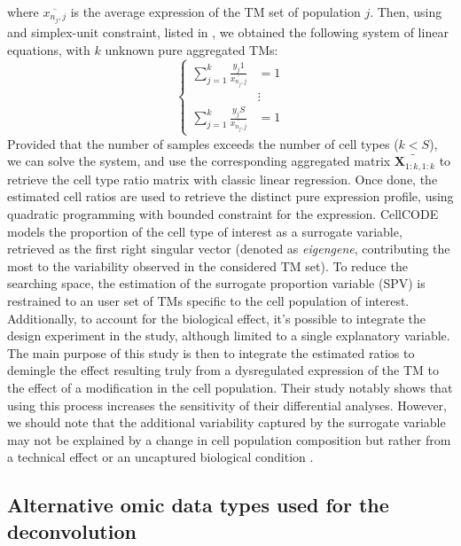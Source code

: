 where \(\overline{x_{n_j, j}}\) is the average expression of the TM
set of population \(j\). Then, using  and simplex-unit constraint, listed in , we obtained the
following system of linear equations, with \(k\) unknown pure aggregated
TMs: \[
\begin{cases}
\sum_{j=1}^k \frac{y_j1}{\overline{x_{n_j, j}}}&=1\\
& \vdots \\
\sum_{j=1}^k \frac{y_jS}{\overline{x_{n_j, j}}}&=1
\end{cases}
\] Provided that the number of samples exceeds the number of cell types
(\(k < S\)), we can solve the system, and use the corresponding
aggregated matrix \(\widetilde{\boldsymbol{X}_{1:k, 1:k}}\) to retrieve the cell type ratio matrix with
classic linear regression. Once done, the estimated cell ratios are used
to retrieve the distinct pure expression profile, using
quadratic programming with bounded constraint for the expression.
CellCODE \autocite{chikina_etal15} models the proportion of the cell type of interest as a
surrogate variable, retrieved as the first right singular vector
(denoted as \emph{eigengene}, contributing the most to the variability
observed in the considered TM set). To reduce the searching space, the
estimation of the surrogate proportion variable (SPV) is restrained to
an user set of TMs specific to the cell population of interest.
Additionally, to account for the biological effect, it's possible to
integrate the design experiment in the study, although limited to a
single explanatory variable. The main purpose of this study is then to
integrate the estimated ratios to demingle the effect resulting truly
from a dysregulated expression of the TM to the effect of a modification
in the cell population. Their study notably shows that using this
process increases the sensitivity of their differential analyses.
However, we should note that the additional variability captured by the
surrogate variable may not be explained by a change in cell population
composition but rather from a technical effect or an uncaptured
biological condition \autocite{venet_etal01}.




\subsection{Alternative omic data types used for the deconvolution}
\label{alternative-omic-data-types-used-for-the-deconvolution}

